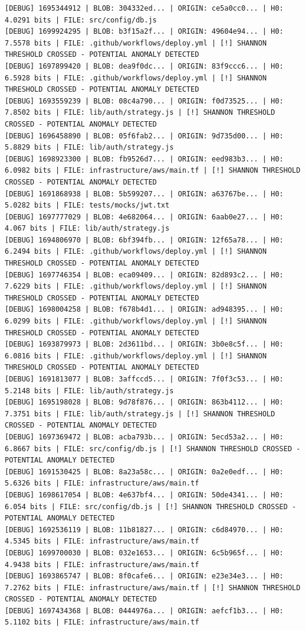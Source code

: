 \documentclass[12pt, a4paper, oneside]{report}
\begin{document}
\begin{lstlisting}[basicstyle=\tiny\ttfamily]
[DEBUG] 1695344912 | BLOB: 304332ed... | ORIGIN: ce5a0cc0... | H0: 4.0291 bits | FILE: src/config/db.js
[DEBUG] 1699924295 | BLOB: b3f15a2f... | ORIGIN: 49604e94... | H0: 7.5578 bits | FILE: .github/workflows/deploy.yml | [!] SHANNON THRESHOLD CROSSED - POTENTIAL ANOMALY DETECTED
[DEBUG] 1697899420 | BLOB: dea9f0dc... | ORIGIN: 83f9ccc6... | H0: 6.5928 bits | FILE: .github/workflows/deploy.yml | [!] SHANNON THRESHOLD CROSSED - POTENTIAL ANOMALY DETECTED
[DEBUG] 1693559239 | BLOB: 08c4a790... | ORIGIN: f0d73525... | H0: 7.8502 bits | FILE: lib/auth/strategy.js | [!] SHANNON THRESHOLD CROSSED - POTENTIAL ANOMALY DETECTED
[DEBUG] 1696458890 | BLOB: 05f6fab2... | ORIGIN: 9d735d00... | H0: 5.8829 bits | FILE: lib/auth/strategy.js
[DEBUG] 1698923300 | BLOB: fb9526d7... | ORIGIN: eed983b3... | H0: 6.0982 bits | FILE: infrastructure/aws/main.tf | [!] SHANNON THRESHOLD CROSSED - POTENTIAL ANOMALY DETECTED
[DEBUG] 1691868938 | BLOB: 5b599207... | ORIGIN: a63767be... | H0: 5.0282 bits | FILE: tests/mocks/jwt.txt
[DEBUG] 1697777029 | BLOB: 4e682064... | ORIGIN: 6aab0e27... | H0: 4.067 bits | FILE: lib/auth/strategy.js
[DEBUG] 1694806970 | BLOB: 6bf394fb... | ORIGIN: 12f65a78... | H0: 6.2494 bits | FILE: .github/workflows/deploy.yml | [!] SHANNON THRESHOLD CROSSED - POTENTIAL ANOMALY DETECTED
[DEBUG] 1697746354 | BLOB: eca09409... | ORIGIN: 82d893c2... | H0: 7.6229 bits | FILE: .github/workflows/deploy.yml | [!] SHANNON THRESHOLD CROSSED - POTENTIAL ANOMALY DETECTED
[DEBUG] 1698004258 | BLOB: f678b4d1... | ORIGIN: ad948395... | H0: 6.0299 bits | FILE: .github/workflows/deploy.yml | [!] SHANNON THRESHOLD CROSSED - POTENTIAL ANOMALY DETECTED
[DEBUG] 1693879973 | BLOB: 2d3611bd... | ORIGIN: 3b0e8c5f... | H0: 6.0816 bits | FILE: .github/workflows/deploy.yml | [!] SHANNON THRESHOLD CROSSED - POTENTIAL ANOMALY DETECTED
[DEBUG] 1691813077 | BLOB: 3affccd5... | ORIGIN: 7f0f3c53... | H0: 5.2148 bits | FILE: lib/auth/strategy.js
[DEBUG] 1695198028 | BLOB: 9d78f876... | ORIGIN: 863b4112... | H0: 7.3751 bits | FILE: lib/auth/strategy.js | [!] SHANNON THRESHOLD CROSSED - POTENTIAL ANOMALY DETECTED
[DEBUG] 1697369472 | BLOB: acba793b... | ORIGIN: 5ecd53a2... | H0: 6.8667 bits | FILE: src/config/db.js | [!] SHANNON THRESHOLD CROSSED - POTENTIAL ANOMALY DETECTED
[DEBUG] 1691530425 | BLOB: 8a23a58c... | ORIGIN: 0a2e0edf... | H0: 5.6326 bits | FILE: infrastructure/aws/main.tf
[DEBUG] 1698617054 | BLOB: 4e637bf4... | ORIGIN: 50de4341... | H0: 6.054 bits | FILE: src/config/db.js | [!] SHANNON THRESHOLD CROSSED - POTENTIAL ANOMALY DETECTED
[DEBUG] 1692536119 | BLOB: 11b81827... | ORIGIN: c6d84970... | H0: 4.5345 bits | FILE: infrastructure/aws/main.tf
[DEBUG] 1699700030 | BLOB: 032e1653... | ORIGIN: 6c5b965f... | H0: 4.9438 bits | FILE: infrastructure/aws/main.tf
[DEBUG] 1693865747 | BLOB: 8f0cafe6... | ORIGIN: e23e34e3... | H0: 7.2762 bits | FILE: infrastructure/aws/main.tf | [!] SHANNON THRESHOLD CROSSED - POTENTIAL ANOMALY DETECTED
[DEBUG] 1697434368 | BLOB: 0444976a... | ORIGIN: aefcf1b3... | H0: 5.1102 bits | FILE: infrastructure/aws/main.tf
\end{lstlisting}
\end{document}
